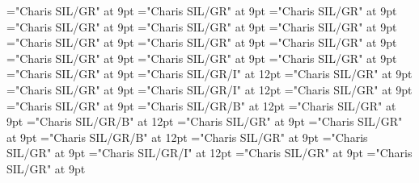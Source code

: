 \documentclass[gps1,twoside]{article}
\begin{document}
\font\spanspanheadwordvariantformentrybackrefvariantformentrybackrefsentrybefore="Charis SIL/GR" at 9pt
\font\spanspanowningentrysummarydefinitionvariantformentrybackrefvariantformentrybackrefsentrybefore="Charis SIL/GR" at 9pt
\font\spanowningentrysummarydefinitionvariantformentrybackrefvariantformentrybackrefsentrylastchildafter="Charis SIL/GR" at 9pt
\font\etymologyentrybefore="Charis SIL/GR" at 9pt
\font\etymologyentryafter="Charis SIL/GR" at 9pt
\font\spanspanformetymologyentrybefore="Charis SIL/GR" at 9pt
\font\spanformetymologyentrylastchildafter="Charis SIL/GR" at 9pt
\font\spanspanglossetymologyentrybefore="Charis SIL/GR" at 9pt
\font\spanglossetymologyentrylastchildafter="Charis SIL/GR" at 9pt
\font\spanspancommentetymologyentrybefore="Charis SIL/GR" at 9pt
\font\spancommentetymologyentrylastchildafter="Charis SIL/GR" at 9pt
\font\spanspanminimallexreferencesentrybefore="Charis SIL/GR" at 9pt
\font\minimallexreferencesentryafter="Charis SIL/GR" at 9pt
\font\spanenownertypeabbreviationminimallexreferenceminimallexreferencesentry="Charis SIL/GR/I" at 12pt
\font\spanspanownertypeabbreviationminimallexreferenceminimallexreferencesentrybefore="Charis SIL/GR" at 9pt
\font\spanownertypeabbreviationminimallexreferenceminimallexreferencesentrylastchildafter="Charis SIL/GR" at 9pt
\font\spanownertypeabbreviationminimallexreferenceminimallexreferencesentry="Charis SIL/GR/I" at 12pt
\font\configtargetconfigtargetconfigtargetsminimallexreferenceminimallexreferencesentrybefore="Charis SIL/GR" at 9pt
\font\configtargetsminimallexreferenceminimallexreferencesentryafter="Charis SIL/GR" at 9pt
\font\spanbzhheadwordconfigtargetconfigtargetsminimallexreferenceminimallexreferencesentry="Charis SIL/GR/B" at 12pt
\font\spanspanheadwordconfigtargetconfigtargetsminimallexreferenceminimallexreferencesentrybefore="Charis SIL/GR" at 9pt
\font\spanheadwordconfigtargetconfigtargetsminimallexreferenceminimallexreferencesentry="Charis SIL/GR/B" at 12pt
\font\spanspansensecontentspansensesentrybefore="Charis SIL/GR" at 9pt
\font\sensesentryafter="Charis SIL/GR" at 9pt
\font\sensenumbersensecontentsensesentry="Charis SIL/GR/B" at 12pt
\font\sensenumbersensecontentsensesentryafter="Charis SIL/GR" at 9pt
\font\morphosyntaxanalysissharedgrammaticalinfosensesentryafter="Charis SIL/GR" at 9pt
\font\morphosyntaxanalysissharedgrammaticalinfosensesentry="Charis SIL/GR/I" at 12pt
\font\spanspanpartofspeechmorphosyntaxanalysissharedgrammaticalinfosensesentrybefore="Charis SIL/GR" at 9pt
\font\spanpartofspeechmorphosyntaxanalysissharedgrammaticalinfosensesentrylastchildafter="Charis SIL/GR" at 9pt
\end{document}
